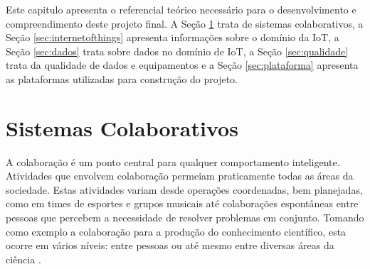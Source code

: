 Este capitulo apresenta o referencial teórico necessário para o desenvolvimento e compreendimento deste projeto final. A Seção \ref{sec:siscol} trata de sistemas colaborativos, a Seção \ref{sec:internetofthings} apresenta informações sobre o domínio da \acrfull{IoT}, a Seção \ref{sec:dados} trata sobre dados no domínio de \acrshort{IoT}, a Seção \ref{sec:qualidade} trata da qualidade de dados e equipamentos e a Seção \ref{sec:plataforma} apresenta as plataformas utilizadas para construção do projeto.

\section{Sistemas Colaborativos}
\label{sec:siscol}
\qqad A colaboração é um ponto central para qualquer comportamento inteligente.
Atividades que envolvem colaboração permeiam praticamente todas as áreas da sociedade. Estas atividades variam desde operações coordenadas,
bem planejadas, como em times de esportes e grupos musicais até colaborações espontâneas
entre pessoas que percebem a necessidade de resolver problemas em conjunto.
Tomando como exemplo a colaboração para a produção do conhecimento científico, esta ocorre em vários níveis: entre pessoas ou até mesmo entre diversas áreas da ciência \cite{cbarbara}.

